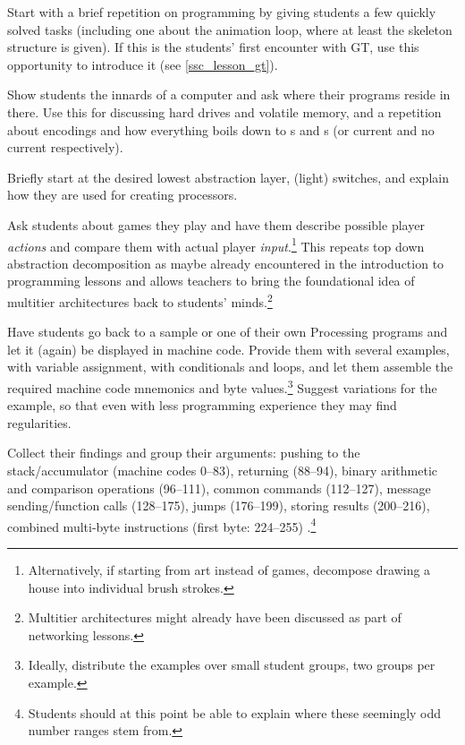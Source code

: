 \begin{instructions}
\item Start with a brief repetition on programming by giving students a few quickly solved tasks (including one about the animation loop, where at least the skeleton structure is given). If this is the students' first encounter with \ac{GT}, use this opportunity to introduce it (see \ref{ssc_lesson_gt}).
\item Show students the innards of a computer and ask where their programs reside in there. Use this for discussing hard drives and volatile memory, and a repetition about encodings and how everything boils down to s and s (or current and no current respectively).
\item Briefly start at the desired lowest abstraction layer, \eg (light) switches, and explain how they are used for creating processors.
\item Ask students about games they play and have them describe possible player \emph{actions} and compare them with actual player \emph{input}.\footnote{Alternatively, if starting from art instead of games, decompose drawing \eg a house into individual brush strokes.} This repeats top down abstraction decomposition as maybe already encountered in the introduction to programming lessons and allows teachers to bring the foundational idea of multitier architectures back to students' minds.\footnote{Multitier architectures might already have been discussed as part of networking lessons.}
\item Have students go back to a sample or one of their own Processing programs and let it (again) be displayed in machine code. Provide them with several examples, \eg with variable assignment, with conditionals and loops, and let them assemble the required machine code mnemonics and byte values.\footnote{Ideally, distribute the examples over small student groups, two groups per example.} Suggest variations for the example, so that even with less programming experience they may find regularities.
\item Collect their findings and group their arguments: pushing to the stack/accumulator (machine codes 0--83), returning (88--94), binary arithmetic and comparison operations (96--111), common commands (112--127), message sending/function calls (128--175), jumps (176--199), storing results (200--216), combined multi-byte instructions (first byte: 224--255) \cite[p.\,12]{Ber14}.\footnote{Students should at this point be able to explain where these seemingly odd number ranges stem from.}

\end{instructions}

